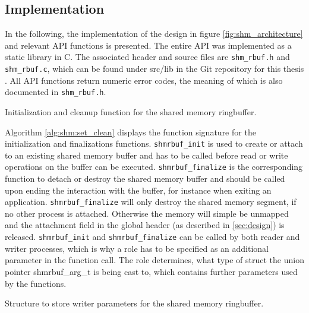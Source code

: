 \subsection{Implementation}
In the following, the implementation of the design in figure \ref{fig:shm_architecture} and relevant API functions is presented.
The entire API was implemented as a static library in C. The associated header and source files are \texttt{shm\_rbuf.h} and \texttt{shm\_rbuf.c}, which can be found 
under src/lib in the Git repository for this thesis \cite{gitlab}. All API functions return numeric error codes, the meaning of which is also documented in \texttt{shm\_rbuf.h}.  
\par
\begin{algorithm}[h!]
    
    \label{alg:shm:set_clean}
    \caption[Shared Memory Ringbuffer: Initialization and Cleanup]{Initialization and cleanup function for the shared memory ringbuffer.}
\end{algorithm}
Algorithm \ref{alg:shm:set_clean} displays the function signature for  the initialization and finalizations functions.
\texttt{shmrbuf\_init} is used to create or attach to an existing shared memory buffer and has to be called before read or write operations
on the buffer can be executed. \texttt{shmrbuf\_finalize} is the corresponding function to detach or destroy the shared memory buffer and should be called
upon ending the interaction with the buffer, for instance when exiting an application. \texttt{shmrbuf\_finalize} will only destroy the shared memory segment,
if no other process is attached. Otherwise the memory will simple be unmapped and the attachment field in the global header (as described in \ref{sec:design}) is released. 
\texttt{shmrbuf\_init} and \texttt{shmrbuf\_finalize} can be called by both reader and writer 
processes, which is why a role has to be specified as an additional parameter in the function call. The role determines, what type of struct the union pointer shmrbuf\_arg\_t is being cast to,
which contains further parameters used by the functions. 

\begin{algorithm}[h!]
    
    \label{alg:shm:writer_arg}
    \caption[Shared Memory Ringbuffer: Writer Parameters]{Structure to store writer parameters for the shared memory ringbuffer.}
\end{algorithm}

